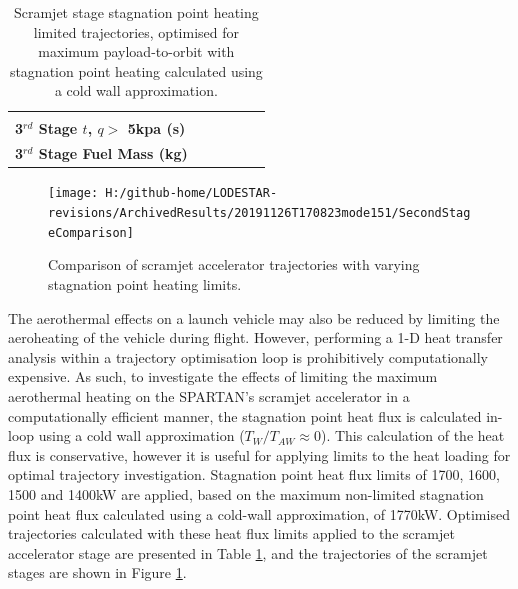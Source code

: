 \begin{table}[ht]
\begin{tabular}{l c c c c c }
		& \textbf{\thirddExergyEffheatLimStandard}
		& \textbf{\thirddExergyEffheatLimSeventeenHundred}
		& \textbf{\thirddExergyEffheatLimSixteenHundred}
		& \textbf{\thirddExergyEffheatLimFifteenHundred}
		& \textbf{\thirddExergyEffheatLimFourteenHundred}
		\\
		\textbf{3$^{rd}$ Stage $t$, $q >$ 5kpa (s)}
		& \thirdqOverFiveheatLimStandard
		& \thirdqOverFiveheatLimSeventeenHundred
		& \thirdqOverFiveheatLimSixteenHundred
		& \thirdqOverFiveheatLimFifteenHundred
		& \thirdqOverFiveheatLimFourteenHundred
		\\
		\textbf{3$^{rd}$ Stage Fuel Mass (kg)}
		& \thirdmFuelheatLimStandard
		& \thirdmFuelheatLimSeventeenHundred
		& \thirdmFuelheatLimSixteenHundred
		& \thirdmFuelheatLimFifteenHundred
		& \thirdmFuelheatLimFourteenHundred
		\\
		\hline 
	\end{tabular} 
	\caption{Scramjet stage stagnation point heating limited trajectories, optimised for maximum payload-to-orbit with stagnation point heating calculated using a cold wall approximation. }
	\label{tab:stagLim}
\end{table}

\begin{figure}[!ht]
\centering
\texttt{[image: H:/github-home/LODESTAR-revisions/ArchivedResults/20191126T170823mode151/SecondStageComparison]}
\caption{Comparison of scramjet accelerator trajectories with varying stagnation point heating limits.}
\label{fig:SecondStageheatlimComparison}
\end{figure}


The aerothermal effects on a launch vehicle may also be reduced by limiting the aeroheating of the vehicle during flight. However, performing a 1-D heat transfer analysis within a trajectory optimisation loop is prohibitively computationally expensive. 
As such, to investigate the effects of limiting the maximum aerothermal heating on the SPARTAN's scramjet accelerator in a computationally efficient manner, the stagnation point heat flux is calculated in-loop using a cold wall approximation ($T_W/T_{AW} \approx 0$). This calculation of the heat flux is conservative, however it is useful for applying limits to the heat loading for optimal trajectory investigation. Stagnation point heat flux limits of 1700, 1600, 1500 and 1400kW are applied, based on the maximum non-limited stagnation point heat flux calculated using a cold-wall approximation, of 1770kW. Optimised trajectories calculated with these heat flux limits applied to the scramjet accelerator stage are presented in Table \ref{tab:stagLim}, and the trajectories of the scramjet stages are shown in Figure \ref{fig:SecondStageheatlimComparison}. 

